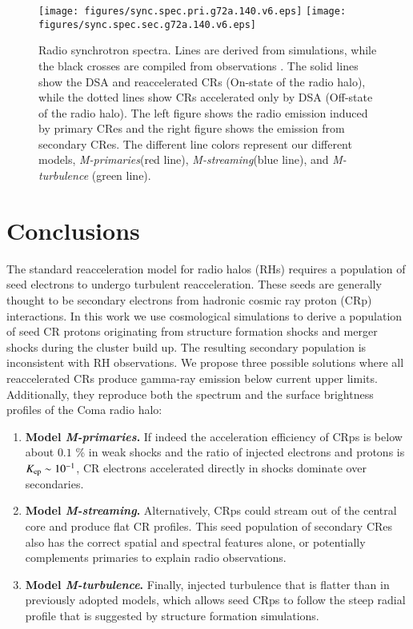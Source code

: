 \documentclass[useAMS,usenatbib]{mn2e}
\newcommand{\Mstream}{{\it M-streaming}\xspace}
\newcommand{\Mflatturb}{{\it M-turbulence}\xspace}
\newcommand{\Mprimary}{{\it M-primaries}\xspace}
\begin{document}
\begin{figure*}
  \texttt{[image: figures/sync.spec.pri.g72a.140.v6.eps]}
  \texttt{[image: figures/sync.spec.sec.g72a.140.v6.eps]}
  \caption{Radio synchrotron spectra. Lines are derived from
    simulations, while the black crosses are compiled from
    observations \citet{2010PhDT.......259P}. The solid lines show the
    DSA and reaccelerated CRs (On-state of the radio halo), while the
    dotted lines show CRs accelerated only by DSA (Off-state of the
    radio halo). The left figure shows the radio emission induced by
    primary CRes and the right figure shows the emission from
    secondary CRes. The different line colors represent our different
    models, \Mprimary (red line), \Mstream (blue line), and \Mflatturb
    (green line).}
  \label{fig:sync_spectrum}
\end{figure*}


\section{Conclusions}
\label{sec:conclusions}

The standard reacceleration model for radio halos (RHs) requires a
population of seed electrons to undergo turbulent
reacceleration. These seeds are generally thought to be secondary
electrons from hadronic cosmic ray proton (CRp) interactions. In this
work we use cosmological simulations to derive a population of seed CR
protons originating from structure formation shocks and merger shocks
during the cluster build up. The resulting secondary population is
inconsistent with RH observations. We propose three possible solutions
where all reaccelerated CRs produce gamma-ray emission below current
upper limits. Additionally, they reproduce both the spectrum and the
surface brightness profiles of the Coma radio halo:

\begin{enumerate}
\item {\bf Model {\em M-primaries}.} If indeed the acceleration
  efficiency of CRps is below about $0.1$ {\%} in weak shocks and the
  ratio of injected electrons and protons is $K_{{\mathrm{ep}}} \sim
  10^{-1}$, CR electrons accelerated directly in shocks dominate over
  secondaries.
\item {\bf Model {\em M-streaming}.} Alternatively, CRps could stream
  out of the central core and produce flat CR profiles. This seed
  population of secondary CRes also has the correct spatial and
  spectral features alone, or potentially complements primaries to
  explain radio observations.
\item {\bf Model {\em M-turbulence}.}  Finally, injected turbulence
  that is flatter than in previously adopted models, which allows seed
  CRps to follow the steep radial profile that is suggested by
  structure formation simulations.
\end{enumerate}
\end{document}
